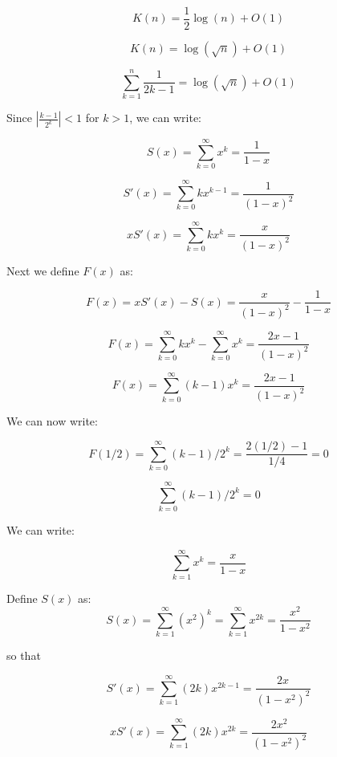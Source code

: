\documentclass[a4paper,12pt]{article}
\begin{document}
\[ K(n) = \frac{1}{2}\log(n) + O(1)  \]

\[ K(n) = \log(\sqrt{n}) + O(1) \]

\[ \sum_{k=1}^n \frac{1}{2k-1} = \log(\sqrt{n}) + O(1) \]


Since $|\frac{k-1}{2^k}| < 1$ for $k > 1$, we can write:

\[ S(x) = \sum_{k=0}^\infty x^k = \frac{1}{1-x} \]

\[ S'(x) = \sum_{k=0}^\infty k x^{k-1} = \frac{1}{(1-x)^2} \]

\[ xS'(x) = \sum_{k=0}^\infty k x^{k} = \frac{x}{(1-x)^2}  \]

Next we define $F(x)$ as:

\[ F(x) = xS'(x) - S(x) = \frac{x}{(1-x)^2} - \frac{1}{1-x} \]

\[ F(x) = \sum_{k=0}^\infty k x^k - \sum_{k=0}^\infty x^k = \frac{2x-1}{(1-x)^2}\]

\[ F(x) = \sum_{k=0}^\infty (k-1)x^k = \frac{2x-1}{(1-x)^2} \]

We can now write:

\[ F(1/2) = \sum_{k=0}^\infty (k-1)/2^k = \frac{2(1/2) - 1}{1/4} = 0 \]

\[ \sum_{k=0}^\infty (k-1)/2^k  = 0 \]


We can write:

\[ \sum_{k=1}^\infty x^k = \frac{x}{1-x} \]

Define $S(x)$ as:
\[ S(x) = \sum_{k=1}^\infty (x^2)^k = \sum_{k=1}^\infty x^{2k} = \frac{x^2}{1-x^2} \]

so that

\[ S'(x) = \sum_{k=1}^\infty (2k)x^{2k-1} = \frac{2x}{(1-x^2)^2} \]

\[ xS'(x) = \sum_{k=1}^\infty (2k)x^{2k} = \frac{2x^2}{(1-x^2)^2}  \]
\end{document}
